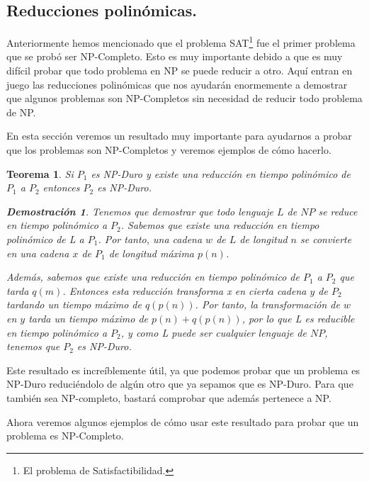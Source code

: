 \documentclass[a4paper,12pt,titlepage]{article}
\newtheorem{teo}{Teorema}[section]
\newtheorem*{dem}{\textbf{Demostraci\'on}}
\begin{document}
\subsection{Reducciones polin\'omicas.}\label{red_poli}
\label{reduc1}

Anteriormente hemos mencionado que el problema SAT\footnote{El problema de Satisfactibilidad.} fue el primer problema que se prob\'o ser NP-Completo. Esto es muy importante debido a que es muy dif\'icil probar que todo problema en NP se puede reducir a otro. Aqu\'i entran en juego las reducciones polin\'omicas que nos ayudar\'an enormemente a demostrar que algunos problemas son NP-Completos sin necesidad de reducir todo problema de NP.

En esta secci\'on veremos un resultado muy importante para ayudarnos a probar que los problemas son NP-Completos y veremos ejemplos de c\'omo hacerlo.

\begin{teo}

Si $P_{1}$ es NP-Duro y existe una reducci\'on en tiempo polin\'omico de $P_{1}$ a $P_2$ entonces $P_2$ es NP-Duro.

\begin{dem}

Tenemos que demostrar que todo lenguaje $L$ de $NP$ se reduce en tiempo polin\'omico a $P_2$. Sabemos que existe una reducci\'on en tiempo polin\'omico de L a $P_1$. Por tanto, una cadena $w$ de $L$ de longitud $n$ se convierte en una cadena $x$ de $P_1$ de longitud m\'axima $p(n)$.

Adem\'as, sabemos que existe una reducci\'on en tiempo polin\'omico de $P_1$ a $P_2$ que tarda $q(m)$. Entonces esta reducci\'on transforma x en cierta cadena $y$ de $P_2$ tardando un tiempo m\'aximo de $q(p(n))$. Por tanto, la transformaci\'on de $w$ en $y$ tarda un tiempo m\'aximo de $p(n) + q(p(n))$, por lo que L es reducible en tiempo polin\'omico a $P_2$, y como L puede ser cualquier lenguaje de $NP$, tenemos que $P_2$ es NP-Duro.

\end{dem}

\end{teo}

Este resultado es incre\'iblemente \'util, ya que podemos probar que un problema es NP-Duro reduci\'endolo de alg\'un otro que ya sepamos que es NP-Duro.
Para que tambi\'en sea NP-completo, bastar\'a comprobar que adem\'as pertenece a NP.

Ahora veremos algunos ejemplos de c\'omo usar este resultado para probar que un problema es NP-Completo.
\end{document}
